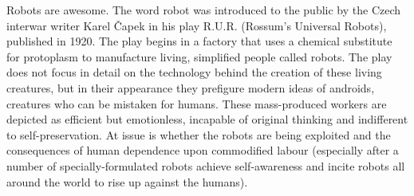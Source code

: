 Robots are awesome. The word robot was introduced to the public by the Czech
interwar writer Karel Čapek in his play R.U.R. (Rossum's Universal Robots),
published in 1920. The play begins in a factory that uses a chemical substitute
for protoplasm to manufacture living, simplified people called robots. The play
does not focus in detail on the technology behind the creation of these living
creatures, but in their appearance they prefigure modern ideas of androids,
creatures who can be mistaken for humans. These mass-produced workers are
depicted as efficient but emotionless, incapable of original thinking and
indifferent to self-preservation. At issue is whether the robots are being
exploited and the consequences of human dependence upon commodified labour
(especially after a number of specially-formulated robots achieve
self-awareness and incite robots all around the world to rise up against the
humans).
